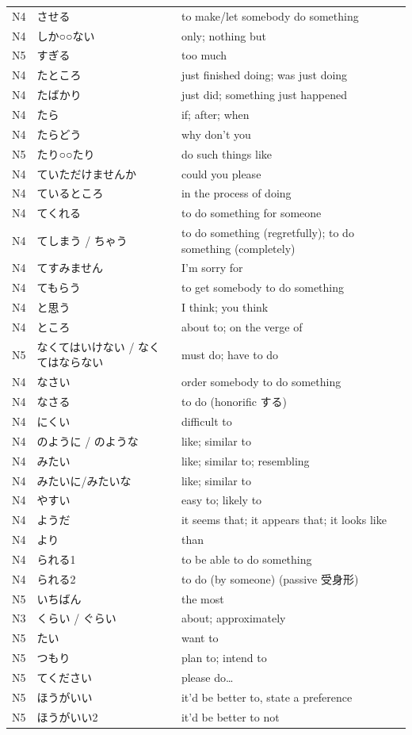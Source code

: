 \begin{longtable}{p{2cm} p{4cm} p{8cm}}
N4	&   させる &       	to make/let somebody do something\\
N4	&   しか○○ない &	    only; nothing but\\
N5	&   すぎる     &   	too much\\
N4	&   たところ    &   	just finished doing; was just doing\\
N4	&   たばかり    &   	just did; something just happened\\
N4	&   たら  &       	if; after; when\\
N4	&   たらどう    &	why don't you\\
N5	&   たり○○たり  &	do such things like\\
N4	&   ていただけませんか&	could you please\\
N4	&   ているところ  &	in the process of doing\\
N4	&   てくれる    &	to do something for someone \\
N4	&   てしまう / ちゃう  &	to do something (regretfully); to do something (completely) \\
N4	&   てすみません  &	I'm sorry for\\
N4	&   てもらう    &	to get somebody to do something\\
N4	&   と思う &       	I think; you think\\
N4	&   ところ     &   	about to; on the verge of\\
N5	&   なくてはいけない / なくてはならない &	must do; have to do\\
N4	&   なさい	&       order somebody to do something\\
N4	&   なさる &       	to do (honorific する) \\
N4	&   にくい     &   	difficult to\\
N4	&   のように / のような &	like; similar to\\
N4	&   みたい &       	like; similar to; resembling\\
N4	&   みたいに/みたいな   &	like; similar to\\
N4	&   やすい &       	easy to; likely to\\
N4	&   ようだ &       	it seems that; it appears that; it looks like\\
N4  &	より  &       	than\\
N4	&   られる1    &   	to be able to do something\\
N4	&   られる2    &   	to do (by someone) (passive 受身形)\\
N5	&   いちばん    &	the most \\
N3	&   くらい / ぐらい   &	about; approximately\\
N5	&   たい  &	want to\\
N5	&   つもり &	plan to; intend to\\
N5	&   てください   &	please do…\\
N5	&   ほうがいい   &	it'd be better to, state a preference\\
N5	&   ほうがいい2  &   	it'd be better to not\\

\end{longtable}



